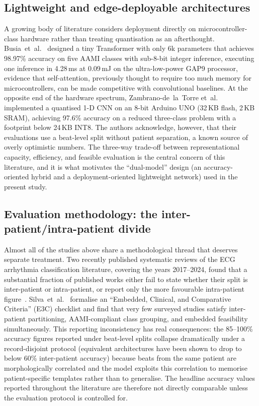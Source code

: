 \subsection{Lightweight and edge-deployable architectures}

A growing body of literature considers deployment directly on
microcontroller-class hardware rather than treating quantisation as an
afterthought. Busia~et~al.~\cite{busia2024tinytransformer} designed a tiny
Transformer with only 6k parameters that achieves 98.97\% accuracy on five
AAMI classes with sub-8-bit integer inference, executing one inference in
4.28\,ms at 0.09\,mJ on the ultra-low-power GAP9 processor, evidence that
self-attention, previously thought to require too much memory for
microcontrollers, can be made competitive with convolutional baselines. At
the opposite end of the hardware spectrum, Zambrano-de~la~Torre
et~al.~\cite{zambrano2026tinyml} implemented a quantised 1-D CNN on an 8-bit
Arduino UNO (32\,KB flash, 2\,KB SRAM), achieving 97.6\% accuracy on a
reduced three-class problem with a footprint below 24\,KB INT8. The authors
acknowledge, however, that their evaluations use a beat-level split without
patient separation, a known source of overly optimistic numbers. The
three-way trade-off between representational capacity, efficiency, and
feasible evaluation is the central concern of this literature, and it is
what motivates the ``dual-model'' design (an accuracy-oriented hybrid and a
deployment-oriented lightweight network) used in the present study.

\subsection{Evaluation methodology: the inter-patient/intra-patient divide}

Almost all of the studies above share a methodological thread that deserves
separate treatment. Two recently published systematic reviews of the ECG
arrhythmia classification literature, covering the years 2017--2024, found
that a substantial fraction of published works either fail to state whether
their split is inter-patient or intra-patient, or report only the more
favourable intra-patient figure~\cite{silva2025systematic,xiao2023systematic}.
Silva~et~al.~\cite{silva2025systematic} formalise an ``Embedded, Clinical,
and Comparative Criteria'' (E3C) checklist and find that very few surveyed
studies satisfy inter-patient partitioning, AAMI-compliant class grouping,
and embedded feasibility simultaneously. This reporting inconsistency has
real consequences: the 85--100\% accuracy figures reported under beat-level
splits collapse dramatically under a record-disjoint protocol (equivalent
architectures have been shown to drop to below 60\% inter-patient
accuracy) because beats from the same patient are morphologically
correlated and the model exploits this correlation to memorise
patient-specific templates rather than to generalise. The headline accuracy
values reported throughout the literature are therefore not directly
comparable unless the evaluation protocol is controlled for.

